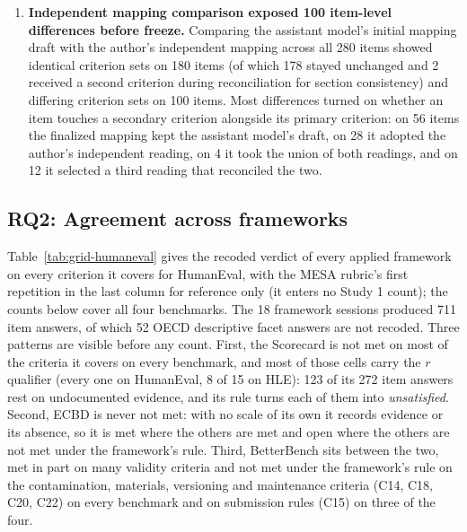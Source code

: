 \documentclass[10pt,conference]{IEEEtran}
\begin{document}
\begin{enumerate}
\item \textbf{Independent mapping comparison exposed 100 item-level differences before freeze.} Comparing the assistant model's initial mapping draft with the author's independent mapping across all 280 items showed identical criterion sets on 180 items (of which 178 stayed unchanged and 2 received a second criterion during reconciliation for section consistency) and differing criterion sets on 100 items. Most differences turned on whether an item touches a secondary criterion alongside its primary criterion: on 56 items the finalized mapping kept the assistant model's draft, on 28 it adopted the author's independent reading, on 4 it took the union of both readings, and on 12 it selected a third reading that reconciled the two.
\end{enumerate}

\subsection{RQ2: Agreement across frameworks}
\label{sec:rq2}
Table~\ref{tab:grid-humaneval} gives the recoded verdict of every applied framework on every criterion it covers for HumanEval, with the MESA rubric's first repetition in the last column for reference only (it enters no Study 1 count); the counts below cover all four benchmarks. The 18 framework sessions produced 711 item answers, of which 52 OECD descriptive facet answers are not recoded. Three patterns are visible before any count. First, the Scorecard is not met on most of the criteria it covers on every benchmark, and most of those cells carry the $r$ qualifier (every one on HumanEval, 8 of 15 on HLE): 123 of its 272 item answers rest on undocumented evidence, and its rule turns each of them into \emph{unsatisfied}. Second, ECBD is never not met: with no scale of its own it records evidence or its absence, so it is met where the others are met and open where the others are not met under the framework's rule. Third, BetterBench sits between the two, met in part on many validity criteria and not met under the framework's rule on the contamination, materials, versioning and maintenance criteria (C14, C18, C20, C22) on every benchmark and on submission rules (C15) on three of the four.
\end{document}
